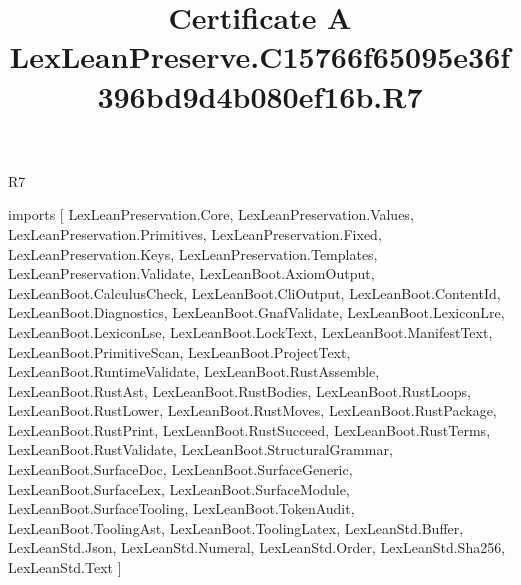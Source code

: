 \begin{lexlean}{R7}
\title{Certificate A LexLeanPreserve.C15766f65095e36f396bd9d4b080ef16b.R7}
\begin{coremodule}
imports [
  LexLeanPreservation.Core,
  LexLeanPreservation.Values,
  LexLeanPreservation.Primitives,
  LexLeanPreservation.Fixed,
  LexLeanPreservation.Keys,
  LexLeanPreservation.Templates,
  LexLeanPreservation.Validate,
  LexLeanBoot.AxiomOutput,
  LexLeanBoot.CalculusCheck,
  LexLeanBoot.CliOutput,
  LexLeanBoot.ContentId,
  LexLeanBoot.Diagnostics,
  LexLeanBoot.GnafValidate,
  LexLeanBoot.LexiconLre,
  LexLeanBoot.LexiconLse,
  LexLeanBoot.LockText,
  LexLeanBoot.ManifestText,
  LexLeanBoot.PrimitiveScan,
  LexLeanBoot.ProjectText,
  LexLeanBoot.RuntimeValidate,
  LexLeanBoot.RustAssemble,
  LexLeanBoot.RustAst,
  LexLeanBoot.RustBodies,
  LexLeanBoot.RustLoops,
  LexLeanBoot.RustLower,
  LexLeanBoot.RustMoves,
  LexLeanBoot.RustPackage,
  LexLeanBoot.RustPrint,
  LexLeanBoot.RustSucceed,
  LexLeanBoot.RustTerms,
  LexLeanBoot.RustValidate,
  LexLeanBoot.StructuralGrammar,
  LexLeanBoot.SurfaceDoc,
  LexLeanBoot.SurfaceGeneric,
  LexLeanBoot.SurfaceLex,
  LexLeanBoot.SurfaceModule,
  LexLeanBoot.SurfaceTooling,
  LexLeanBoot.TokenAudit,
  LexLeanBoot.ToolingAst,
  LexLeanBoot.ToolingLatex,
  LexLeanStd.Buffer,
  LexLeanStd.Json,
  LexLeanStd.Numeral,
  LexLeanStd.Order,
  LexLeanStd.Sha256,
  LexLeanStd.Text
]


\end{coremodule}
\end{lexlean}
